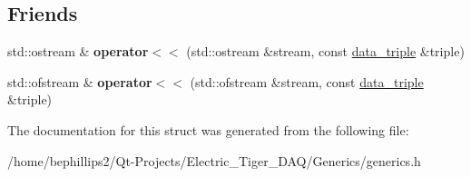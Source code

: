 \subsection*{Friends}
\begin{DoxyCompactItemize}
\item 
std\+::ostream \& {\bfseries operator$<$$<$} (std\+::ostream \&stream, const \hyperlink{structdata__triple}{data\+\_\+triple} \&triple)\hypertarget{structdata__triple_ae1f2fcec0b69760f3a5a9b97d13ec84d}{}\label{structdata__triple_ae1f2fcec0b69760f3a5a9b97d13ec84d}

\item 
std\+::ofstream \& {\bfseries operator$<$$<$} (std\+::ofstream \&stream, const \hyperlink{structdata__triple}{data\+\_\+triple} \&triple)\hypertarget{structdata__triple_a7427c6054c2f2b559c384fc92da91e77}{}\label{structdata__triple_a7427c6054c2f2b559c384fc92da91e77}

\end{DoxyCompactItemize}


The documentation for this struct was generated from the following file\+:\begin{DoxyCompactItemize}
\item 
/home/bephillips2/\+Qt-\/\+Projects/\+Electric\+\_\+\+Tiger\+\_\+\+D\+A\+Q/\+Generics/generics.\+h\end{DoxyCompactItemize}
